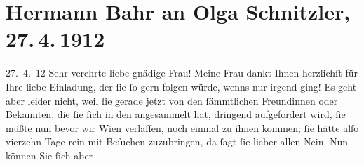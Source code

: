 

         
         \renewcommand{\erwaehntePersonen}{Personen: Anna Bahr-Mildenburg, Olga Schnitzler}
         \renewcommand{\erwaehnteInstitutionen}{Institutionen: Staatsoper}
         \renewcommand{\erwaehnteOrte}{Orte: Wien}
         \renewcommand{\erwaehnteWerke}{}
               \section[Hermann Bahr an Olga Schnitzler, 27. 4. 1912]{ Hermann Bahr an Olga Schnitzler, 27. 4. 1912}\nopagebreak{}\rehead{ }\begin{ledgroupsized}[t]{13cm}\normalsize\beginnumbering \toendnotes[C]{\smallbreak\pagebreak[2]} 
\toendnotes[C]{\smallbreak}\pstart
           \raggedleft{}{\pb}27. 4. 12\pend
           \pstart\center{}Sehr verehrte liebe gnädige Frau!\pend\pstart
           Meine Frau dankt Ihnen
               herzlichſt für Ihre liebe Einladung, der ſie ſo gern folgen würde, wenns nur irgend
               ging! Es geht aber leider nicht, weil ſie gerade jetzt von den ſämmtlichen
               Freundinnen oder Bekannten, die ſie ſich in den \label{K_L02060-1v}\label{K_L02060-1h} angesammelt hat, dringend
               aufgefordert wird, ſie müßte nun bevor wir Wien
               verlaſſen, noch einmal zu ihnen kommen; ſie hätte alſo vierzehn Tage rein mit
               Beſuchen zuzubringen, da ſagt ſie lieber allen Nein. Nun können Sie ſich aber

\end{ledgroupsized}
